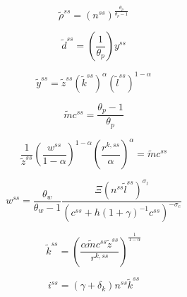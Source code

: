 \documentclass[11pt]{article}
\begin{document}
\[
{\tilde \rho ^{ss}} = {\left( {{n^{ss}}} \right)^{\frac{{{\theta _p}}}{{{\theta
_p} - 1}}}}
\]



\[
{\tilde d^{ss}} = \left( {\frac{1}{{{\theta _p}}}} \right){y^{ss}}
\]



\[
{\tilde y^{ss}} = {\tilde z^{ss}}{\left( {{{\tilde k}^{ss}}} \right)^\alpha
}{({\tilde l^{ss}})^{1 - \alpha }}
\]



\[
\tilde m{c^{ss}} = \frac{{{\theta _p} - 1}}{{{\theta _p}}}
\]



\[
\frac{1}{{{{\tilde z}^{ss}}}}{\left( {\frac{{{w^{ss}}}}{{1 - \alpha }}}
\right)^{1 - \alpha }}{\left( {\frac{{{r^{k,ss}}}}{\alpha }} \right)^\alpha } =
\tilde m{c^{ss}}
\]



\[
{w^{ss}} = \frac{{{\theta _w}}}{{{\theta _w} - 1}}\frac{{\Xi {{\left(
{{n^{ss}}{{\tilde l}^{ss}}} \right)}^{{\sigma _l}}}}}{{{{\left( {{c^{ss}} + h{{(1
+ \gamma )}^{ - 1}}{c^{ss}}} \right)}^{ - {\sigma _c}}}}}
\]



\[
{\tilde k^{ss}} = {\left( {\frac{{\alpha \tilde m{c^{ss}}{{\tilde
z}^{ss}}}}{{{r^{k,ss}}}}} \right)^{\frac{1}{{1 - \alpha }}}}
\]



\[
{i^{ss}} = (\gamma  + {\delta _k}){n^{ss}}{\tilde k^{ss}}
\]
\end{document}
